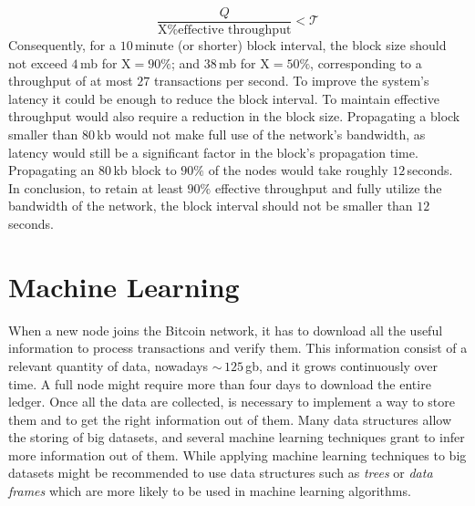 \documentclass[USenglish]{uit-thesis}
\begin{document}
\begin{equation}
\label{eq:effectivethroughput}
\frac{Q}{\text{X\% effective throughput}} < \mathcal{T}
\end{equation}
Consequently, for a $10$\,minute (or shorter) block interval,
the block size should not exceed $4$\,\gls{mb} for $\text{X} = 90\%$;
and $38$\,\gls{mb} for $\text{X} = 50\%$, corresponding to a throughput
of at most $27$ transactions per second.
To improve the system's latency it could be enough
to reduce the block interval. To maintain effective
throughput would also require a reduction in the
block size. Propagating a block smaller than $80$\,\gls{kb} would
not make full use of the network's bandwidth, as latency would
still be a significant factor in the block's propagation time.
Propagating an $80$\,\gls{kb} block to $90\%$ of the nodes would
take roughly $12$\,seconds. In conclusion, to retain at least $90\%$
effective throughput and fully utilize the bandwidth of the network,
the block interval should not be smaller than $12$\,seconds.

\section{Machine Learning}
\label{sec:machinelearning}
When a new node joins the Bitcoin network, it has to download
all the useful information to process transactions and
verify them. This information consist of a relevant quantity
of data, nowadays $\sim$\,$125$\,\gls{gb}, and it grows
continuously over time.
A full node might require more than four days to 
download the entire ledger. Once all the data are
collected, is necessary to implement a way to
store them and to get the right information
out of them. Many data structures allow
the storing of big datasets, and
several machine learning
techniques grant to infer more information
out of them. While applying machine
learning techniques to big datasets
might be recommended to use
data structures such as \emph{trees}
or \emph{data frames} which are
more likely to be used in machine learning
algorithms.
\end{document}
